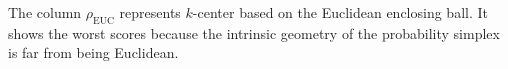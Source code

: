 \documentclass[graybox]{svmult}
\begin{document}

The column $\rho_{\mathrm{EUC}}$ represents $k$-center based on the Euclidean enclosing
ball. It shows the worst scores because the intrinsic geometry of the
probability simplex is far from being Euclidean.

\end{document}
